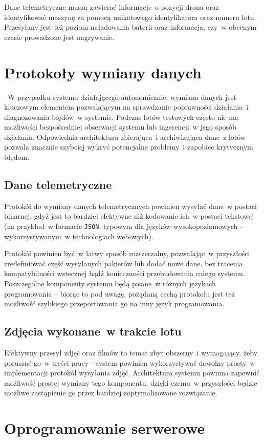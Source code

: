 Dane telemetryczne muszą zawierać informacje~o pozycji
drona oraz identyfikować maszynę za pomocą unikatowego
identyfikatora oraz numeru lotu. Przesyłany jest też
poziom naładowania baterii oraz informacja, czy~w obecnym
czasie prowadzone jest nagrywanie.

\section{Protokoły wymiany danych}
~W przypadku systemu działającego autonomicznie, wymiana danych jest kluczowym
elementem pozwalającym na sprawdzanie poprawności działania~i diagnozowania błędów~w systemie. Podczas lotów testowych
często nie ma możliwości bezpośredniej obserwacji systemu
lub ingerencji~w jego sposób działania. Odpowiednia architektura
zbierająca~i archiwizująca dane~z lotów pozwala znacznie szybciej 
wykryć potencjalne problemy~i zapobiec krytycznym błędom. 

\subsection{Dane telemetryczne}
Protokół do wymiany danych telemetrycznych powinien
wysyłać dane~w postaci binarnej, gdyż jest to bardziej
efektywne niż kodowanie ich~w postaci tekstowej (na
przykład~w formacie \texttt{JSON}, typowym dla języków
wysokopoziomowych - wykorzystywanym~w technologiach webowych).

Protokół powinien być~w łatwy sposób rozszerzalny,
pozwalając~w przyszłości zredefiniować część wysyłanych
pakietów lub dodać nowe dane, bez tracenia kompatybilności
wstecznej bądź konieczności przebudowania całego systemu.
Poszczególne komponenty systemu będą pisane~w różnych
językach programowania -- biorąc to pod uwagę, pożądaną
cechą protokołu jest też możliwość szybkiego przeportowania
go na inny język programowania. 

\subsection{Zdjęcia wykonane~w trakcie lotu}
Efektywny przesył zdjęć oraz filmów to temat zbyt obszerny~i
wymagający, żeby poruszać go~w treści pracy - system
powinien wykorzystywać dowolny prosty~w implementacji
protokół wysyłania zdjęć. Architektura systemu powinna
zapewnić możliwość prostej wymiany tego komponentu, dzięki
czemu~w przyszłości będzie możliwe zastąpienie go
przez bardziej zoptymalizowane rozwiązanie.

\section{Oprogramowanie serwerowe}

